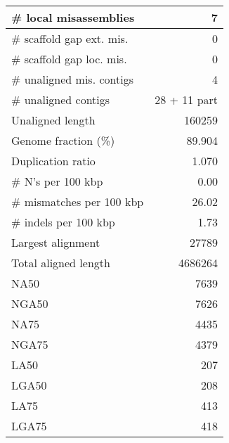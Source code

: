 \documentclass[12pt,a4paper]{article}
\begin{document}
\begin{table}[ht]
\begin{center}
\begin{tabular}{|l*{1}{|r}|}
\# local misassemblies & 7 \\ \hline
\# scaffold gap ext. mis. & 0 \\ \hline
\# scaffold gap loc. mis. & 0 \\ \hline
\# unaligned mis. contigs & 4 \\ \hline
\# unaligned contigs & 28 + 11 part \\ \hline
Unaligned length & 160259 \\ \hline
Genome fraction (\%) & 89.904 \\ \hline
Duplication ratio & 1.070 \\ \hline
\# N's per 100 kbp & 0.00 \\ \hline
\# mismatches per 100 kbp & 26.02 \\ \hline
\# indels per 100 kbp & 1.73 \\ \hline
Largest alignment & 27789 \\ \hline
Total aligned length & 4686264 \\ \hline
NA50 & 7639 \\ \hline
NGA50 & 7626 \\ \hline
NA75 & 4435 \\ \hline
NGA75 & 4379 \\ \hline
LA50 & 207 \\ \hline
LGA50 & 208 \\ \hline
LA75 & 413 \\ \hline
LGA75 & 418 \\ \hline
\end{tabular}
\end{center}
\end{table}
\end{document}
